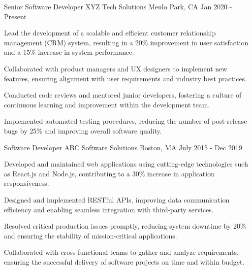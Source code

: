 
\begin{cventries}
  \cventry
    {Senior Software Developer} %
    {XYZ Tech Solutions} %
    {Menlo Park, CA} %
    {Jan 2020 - Present} %
    {
      \begin{cvitems} %
        \item{Lead the development of a scalable and efficient customer relationship management (CRM) system, resulting in a 20\% improvement in user satisfaction and a 15\% increase in system performance.}
        \item{Collaborated with product managers and UX designers to implement new features, ensuring alignment with user requirements and industry best practices.}
        \item{Conducted code reviews and mentored junior developers, fostering a culture of continuous learning and improvement within the development team.}
        \item{Implemented automated testing procedures, reducing the number of post-release bugs by 25\% and improving overall software quality.}
      \end{cvitems}
    }

  \cventry
    {Software Developer} %
    {ABC Software Solutions} %
    {Boston, MA} %
    {July 2015 - Dec 2019} %
    {
      \begin{cvitems} %
        \item{Developed and maintained web applications using cutting-edge technologies such as React.js and Node.js, contributing to a 30\% increase in application responsiveness.}
        \item{Designed and implemented RESTful APIs, improving data communication efficiency and enabling seamless integration with third-party services.}
        \item{Resolved critical production issues promptly, reducing system downtime by 20\% and ensuring the stability of mission-critical applications.}
        \item{Collaborated with cross-functional teams to gather and analyze requirements, ensuring the successful delivery of software projects on time and within budget.}
      \end{cvitems}
    }
\end{cventries}
